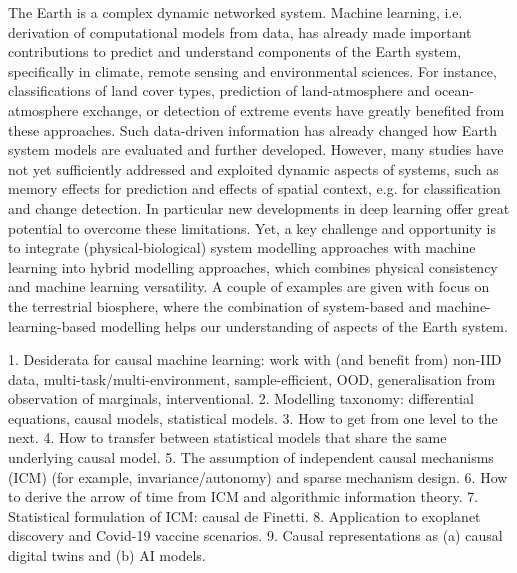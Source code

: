 \documentclass[a4paper,UKenglish]{dagrep-v2018}
\begin{document}
The Earth is a complex dynamic networked system. Machine learning, i.e. derivation of computational models from data, has already made important contributions to predict and understand components of the Earth system, specifically in climate, remote sensing and environmental sciences. For instance, classifications of land cover types, prediction of land-atmosphere and ocean-atmosphere exchange, or detection of extreme events have greatly benefited from these approaches. Such data-driven information has already changed how Earth system models are evaluated and further developed. However, many studies have not yet sufficiently addressed and exploited dynamic aspects of systems, such as memory effects for prediction and effects of spatial context, e.g. for classification and change detection. In particular new developments in deep learning offer great potential to overcome these limitations. Yet, a key challenge and opportunity is to integrate (physical-biological) system modelling approaches with machine learning into hybrid modelling approaches, which combines physical consistency and machine learning versatility. A couple of examples are given with focus on the terrestrial biosphere, where the combination of system-based and machine-learning-based modelling helps our understanding of aspects of the Earth system.

\license

1.	Desiderata for causal machine learning: work with (and benefit from) non-IID data, multi-task/multi-environment, sample-efficient, OOD, generalisation from observation of marginals, interventional.
2.	Modelling taxonomy: differential equations, causal models, statistical models.
3.	How to get from one level to the next.
4.	How to transfer between statistical models that share the same underlying causal model. 
5.	The assumption of independent causal mechanisms (ICM) (for example, invariance/autonomy) and sparse mechanism design. 
6.	How to derive the arrow of time from ICM and algorithmic information theory.
7.	Statistical formulation of ICM: causal de Finetti.
8.	Application to exoplanet discovery and Covid-19 vaccine scenarios.
9.	Causal representations as (a) causal digital twins and (b) AI models.

\license
\end{document}
